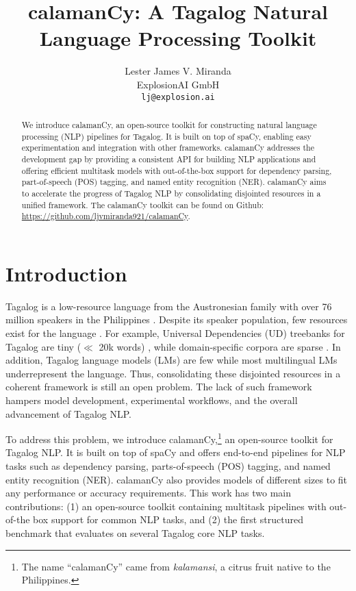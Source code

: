\documentclass[11pt]{article}
\title{calamanCy: A Tagalog Natural Language Processing Toolkit}
\author{Lester James V. Miranda \\
  ExplosionAI GmbH \\
  \texttt{lj@explosion.ai}}
\begin{document}
\maketitle
\begin{abstract}
  We introduce calamanCy, an open-source toolkit for constructing natural language processing (NLP) pipelines for Tagalog.
  It is built on top of spaCy, enabling easy experimentation and integration with other frameworks.  
  calamanCy addresses the development gap by providing a consistent API for building NLP applications and offering efficient multitask models with out-of-the-box support for dependency parsing, part-of-speech (POS) tagging, and named entity recognition (NER).
  calamanCy aims to accelerate the progress of Tagalog NLP by consolidating disjointed resources in a unified framework.
  The calamanCy toolkit can be found on Github: \url{https://github.com/ljvmiranda921/calamanCy}.
\end{abstract}

\section{Introduction}

Tagalog is a low-resource language from the Austronesian family with over 76 million speakers in the Philippines \citep{Lewis2009EthnologueL}.
Despite its speaker population, few resources exist for the language \citep{Cruz2021ImprovingLL}. 
For example, Universal Dependencies (UD) treebanks for Tagalog are tiny ($\ll$ 20k words) \citep{Samson2018TRG,Aquino2020ParsingIT}, 
while domain-specific corpora are sparse \citep{Cabasag2016HatespeechIPLivelo2018IntelligentDI}. 
In addition, Tagalog language models (LMs) \citep{Cruz2021ImprovingLL,Jiang2021PretrainedLM} are few while most multilingual LMs \citep{Conneau2019UnsupervisedCR,Devlin2019BERTPO} underrepresent the language.
Thus, consolidating these disjointed resources in a coherent framework is still an open problem.
The lack of such framework hampers model development, experimental workflows, and the overall advancement of Tagalog NLP.

To address this problem, we introduce calamanCy,\footnote[1]{
  The name ``calamanCy'' came from \textit{kalamansi}, a citrus fruit native to the Philippines.}
an open-source toolkit for Tagalog NLP. 
It is built on top of spaCy \citep{Honnibal2020Spacy} and offers end-to-end pipelines for NLP tasks such as dependency parsing, parts-of-speech (POS) tagging, and named entity recognition (NER). 
calamanCy also provides models of different sizes to fit any performance or accuracy requirements.
This work has two main contributions: (1) an open-source toolkit containing multitask pipelines with out-of-the box support for common NLP tasks, and (2) the first structured benchmark that evaluates on several Tagalog core NLP tasks.
\end{document}
